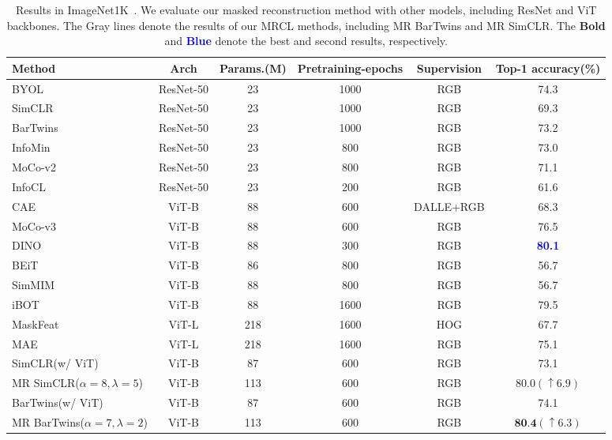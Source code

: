 \documentclass[10pt,twocolumn,letterpaper]{article}
\begin{document}
\begin{table*}[th!]
    \centering
    \small
    \begin{tabular}[width=\textwidth]{l|ccccc}
    \toprule
        Method & Arch &Params.(M) & Pretraining-epochs & Supervision& Top-1 accuracy(\%)   \\
        \midrule
         BYOL\cite{grill2020bootstrap} & ResNet-50 & 23&1000 &RGB&74.3\\
         SimCLR\cite{chen2020simple} & ResNet-50 &23 & 1000&RGB&69.3\\
         BarTwins\cite{zbontar2021barlow} & ResNet-50&23&1000 &RGB&73.2\\
         InfoMin\cite{tian2020makes} & ResNet-50 & 23& 800 &RGB&73.0\\
         MoCo-v2\cite{chen2020improved} & ResNet-50&23&800&RGB&71.1\\
         InfoCL\cite{wang2022rethinking}& ResNet-50&23&200&RGB&61.6\\
         \midrule
         CAE\cite{chen2022context} & ViT-B & 88 & 600 & DALLE+RGB & 68.3\\
         MoCo-v3\cite{chen2021empirical} & ViT-B&88&600&RGB&76.5\\
         DINO\cite{caron2021emerging} & ViT-B & 88 & 300 & RGB & \textbf{\textcolor{blue}{80.1}}  \\
         BEiT\cite{bao2021beit} & ViT-B & 86 & 800  & RGB & 56.7  \\
         SimMIM\cite{xie2022simmim} & ViT-B & 88 & 800 & RGB & 56.7    \\
         iBOT\cite{zhou2021ibot}& ViT-B & 88 & 1600 & RGB & 79.5\\
         MaskFeat\cite{wei2022masked} & ViT-L & 218 & 1600 &HOG& 67.7\\
         MAE\cite{he2022masked} & ViT-L & 218 & 1600 & RGB & 75.1\\
         \midrule[1pt]
         SimCLR(w/ ViT) & ViT-B & 87 & 600 &RGB& 73.1 \\
         \rowcolor{gray!20} MR SimCLR($\alpha=8,\lambda=5$) & ViT-B & 113 & 600 &RGB& $80.0(\uparrow 6.9)$ \\
         \midrule
         BarTwins(w/ ViT) & ViT-B & 87 & 600 &RGB& 74.1\\
         \rowcolor{gray!20} MR BarTwins($\alpha=7,\lambda=2$) & ViT-B & 113 & 600 &RGB& $\textbf{80.4}(\uparrow 6.3)$\\
         \bottomrule
    \end{tabular}
    \caption{Results in ImageNet1K~\cite{deng2009imagenet}. We evaluate our masked reconstruction method with other models, including ResNet and ViT backbones. The \colorbox{gray!20}{Gray} lines denote the results of our MRCL methods, including MR BarTwins and MR SimCLR. The \textbf{Bold} and \textbf{\textcolor{blue}{Blue}} denote the best and second results, respectively.}
    \label{table:Imagenet}
\end{table*}
\end{document}
